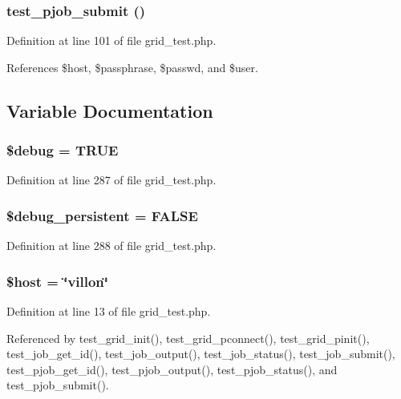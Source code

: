 \subsubsection{\setlength{\rightskip}{0pt plus 5cm}test\_\-pjob\_\-submit ()}\label{grid__test_8php_a9}




Definition at line 101 of file grid\_\-test.php.

References \$host, \$passphrase, \$passwd, and \$user.

\subsection{Variable Documentation}
\subsubsection{\setlength{\rightskip}{0pt plus 5cm}\$debug = TRUE}\label{grid__test_8php_a0}




Definition at line 287 of file grid\_\-test.php.
\subsubsection{\setlength{\rightskip}{0pt plus 5cm}\$debug\_\-persistent = FALSE}\label{grid__test_8php_a5}




Definition at line 288 of file grid\_\-test.php.
\subsubsection{\setlength{\rightskip}{0pt plus 5cm}\$host = \char`\"{}villon\char`\"{}}\label{grid__test_8php_a2}




Definition at line 13 of file grid\_\-test.php.

Referenced by test\_\-grid\_\-init(), test\_\-grid\_\-pconnect(), test\_\-grid\_\-pinit(), test\_\-job\_\-get\_\-id(), test\_\-job\_\-output(), test\_\-job\_\-status(), test\_\-job\_\-submit(), test\_\-pjob\_\-get\_\-id(), test\_\-pjob\_\-output(), test\_\-pjob\_\-status(), and test\_\-pjob\_\-submit().
